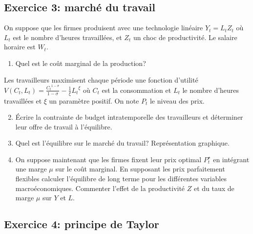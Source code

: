 \documentclass{article}
\begin{document}
\begin{enumerate}
\begin{enumerate}
\end{enumerate}


\hypertarget{mcq}{\subsection{Exercice 3: marché du travail}\label{exo3}}


On suppose que les firmes produisent avec une technologie linéaire
\(Y_t = L_t Z_t\) où \(L_t\) est le nombre d'heures travaillées, et
\(Z_t\) un choc de productivité. Le salaire horaire est \(W_t\).

\begin{enumerate}
    
\item Quel est le coût marginal de la production?

\end{enumerate}

Les travailleurs maximisent chaque période une fonction d'utilité \(V(C_t,L_t) = \frac{{C_t}^{1-\sigma}}{1-\sigma} - \frac{1}{\xi}{L_t}^{\xi}\)
    où \(C_t\) est la consommation et \(L_t\) le nombre d'heures travaillées  et \(\xi\) un paramètre positif. On note \(P_t\) le niveau des prix.

\begin{enumerate}

\setcounter{enumi}{1}

\item Écrire la contrainte de budget intratemporelle des travailleurs et déterminer leur offre de travail à l'équilibre.
    
\item Quel est l'équilibre sur le marché du travail? Représentation
    graphique.
    
\item On suppose maintenant que les firmes fixent leur prix optimal \(P^{\star}_t\) en intégrant une marge \(\mu\) sur le coût marginal. En supposant les prix parfaitement flexibles calculer l'équilibre de
long terme pour les différentes variables macroéconomiques. Commenter l'effet de la productivité \(Z\) et du taux de marge \(\mu\) sur \(Y\) et \(L\).
    
\end{enumerate}

\hypertarget{exo4}{\subsection{Exercice 4: principe de Taylor}\label{exo4}}



\end{enumerate}
\end{document}
